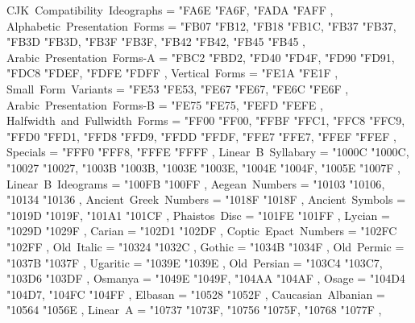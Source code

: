 {    CJK~Compatibility~Ideographs                   = { {"FA6E} {"FA6F}, {"FADA} {"FAFF} },
    Alphabetic~Presentation~Forms                  = { {"FB07} {"FB12}, {"FB18} {"FB1C}, {"FB37} {"FB37}, {"FB3D} {"FB3D}, {"FB3F} {"FB3F}, {"FB42} {"FB42}, {"FB45} {"FB45} },
    Arabic~Presentation~Forms-A                    = { {"FBC2} {"FBD2}, {"FD40} {"FD4F}, {"FD90} {"FD91}, {"FDC8} {"FDEF}, {"FDFE} {"FDFF} },
    Vertical~Forms                                 = { {"FE1A} {"FE1F} },
    Small~Form~Variants                            = { {"FE53} {"FE53}, {"FE67} {"FE67}, {"FE6C} {"FE6F} },
    Arabic~Presentation~Forms-B                    = { {"FE75} {"FE75}, {"FEFD} {"FEFE} },
    Halfwidth~and~Fullwidth~Forms                  = { {"FF00} {"FF00}, {"FFBF} {"FFC1}, {"FFC8} {"FFC9}, {"FFD0} {"FFD1}, {"FFD8} {"FFD9}, {"FFDD} {"FFDF}, {"FFE7} {"FFE7}, {"FFEF} {"FFEF} },
    Specials                                       = { {"FFF0} {"FFF8}, {"FFFE} {"FFFF} },
    Linear~B~Syllabary                             = { {"1000C} {"1000C}, {"10027} {"10027}, {"1003B} {"1003B}, {"1003E} {"1003E}, {"1004E} {"1004F}, {"1005E} {"1007F} },
    Linear~B~Ideograms                             = { {"100FB} {"100FF} },
    Aegean~Numbers                                 = { {"10103} {"10106}, {"10134} {"10136} },
    Ancient~Greek~Numbers                          = { {"1018F} {"1018F} },
    Ancient~Symbols                                = { {"1019D} {"1019F}, {"101A1} {"101CF} },
    Phaistos~Disc                                  = { {"101FE} {"101FF} },
    Lycian                                         = { {"1029D} {"1029F} },
    Carian                                         = { {"102D1} {"102DF} },
    Coptic~Epact~Numbers                           = { {"102FC} {"102FF} },
    Old~Italic                                     = { {"10324} {"1032C} },
    Gothic                                         = { {"1034B} {"1034F} },
    Old~Permic                                     = { {"1037B} {"1037F} },
    Ugaritic                                       = { {"1039E} {"1039E} },
    Old~Persian                                    = { {"103C4} {"103C7}, {"103D6} {"103DF} },
    Osmanya                                        = { {"1049E} {"1049F}, {"104AA} {"104AF} },
    Osage                                          = { {"104D4} {"104D7}, {"104FC} {"104FF} },
    Elbasan                                        = { {"10528} {"1052F} },
    Caucasian~Albanian                             = { {"10564} {"1056E} },
    Linear~A                                       = { {"10737} {"1073F}, {"10756} {"1075F}, {"10768} {"1077F} },
}
